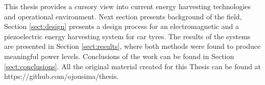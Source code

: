 This thesis provides a cursory view into current energy harvesting technologies and operational environment. Next section presents background of the field, Section \ref{sect:design} presents a design process for an electromagnetic and a piezoelectric energy harvesting system for car tyres. The results of the systems are presented in Section \ref{sect:results}, where both methods were found to produce meaningful power levels. Conclusions of the work can be found in Section \ref{sect:conclusions}. All the original material created for this Thesis can be found at https://github.com/ojousima/thesis. 
